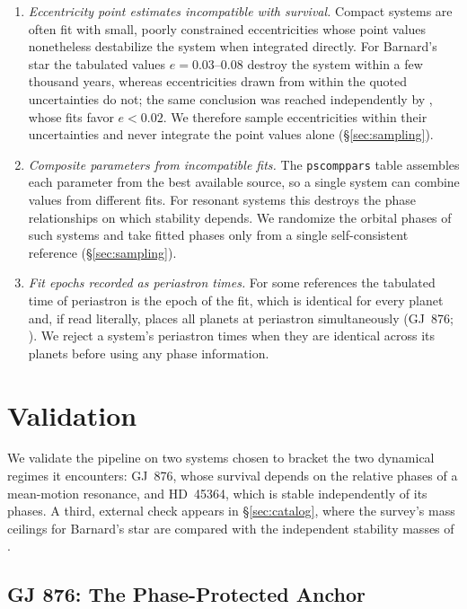 \documentclass[twocolumn]{aastex631}
\begin{document}
\begin{enumerate}
\item \textit{Eccentricity point estimates incompatible with survival.}
Compact systems are often fit with small, poorly constrained
eccentricities whose point values nonetheless destabilize the system when
integrated directly. For Barnard's star the tabulated values
$e = 0.03$--$0.08$ destroy the system within a few thousand years, whereas
eccentricities drawn from within the quoted uncertainties do not; the same
conclusion was reached independently by \citet{Basant2025}, whose fits
favor $e < 0.02$. We therefore sample eccentricities within their
uncertainties and never integrate the point values alone
(\S\ref{sec:sampling}).
\item \textit{Composite parameters from incompatible fits.} The
\texttt{pscomppars} table assembles each parameter from the best available
source, so a single system can combine values from different fits. For
resonant systems this destroys the phase relationships on which stability
depends. We randomize the orbital phases of such systems and take fitted
phases only from a single self-consistent reference (\S\ref{sec:sampling}).
\item \textit{Fit epochs recorded as periastron times.} For some
references the tabulated time of periastron is the epoch of the fit, which
is identical for every planet and, if read literally, places all planets
at periastron simultaneously (GJ~876; \citealt{Rivera2010}). We reject a
system's periastron times when they are identical across its planets
before using any phase information.
\end{enumerate}

\section{Validation} \label{sec:validation}

We validate the pipeline on two systems chosen to bracket the two
dynamical regimes it encounters: GJ~876, whose survival depends on the
relative phases of a mean-motion resonance, and HD~45364, which is stable
independently of its phases. A third, external check appears in
\S\ref{sec:catalog}, where the survey's mass ceilings for Barnard's star
are compared with the independent stability masses of \citet{Byrne2026}.

\subsection{GJ 876: The Phase-Protected Anchor} \label{sec:gj876}
\end{document}
